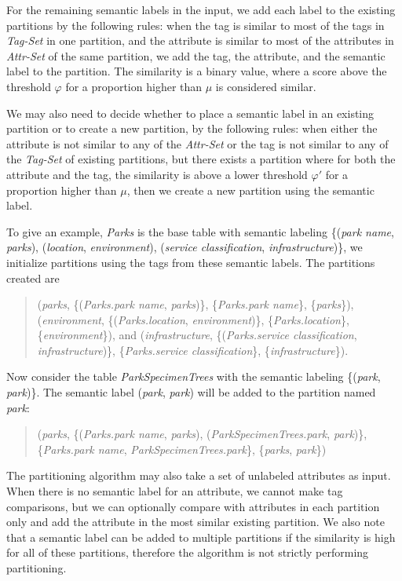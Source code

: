 For the remaining semantic labels in the input, we add each label to the existing partitions by the following rules: when the tag is similar to most of the tags in \textit{Tag-Set} in one partition, and the attribute is similar to most of the attributes in \textit{Attr-Set} of the same partition, we add the tag, the attribute, and the semantic label to the partition. The similarity is a binary value, where a score above the threshold $\varphi$ for a proportion higher than $\mu$ is considered similar. 

We may also need to decide whether to place a semantic label in an existing partition or to create a new partition, by the following rules: when either the attribute is not similar to any of the \textit{Attr-Set} or the tag is not similar to any of the \textit{Tag-Set} of existing partitions, but there exists a partition where for both the attribute and the tag, the similarity is above a lower threshold $\varphi '$ for a proportion higher than $\mu$, then we create a new partition using the semantic label.

To give an example, \textit{Parks} is the base table with semantic labeling \{(\textit{park name}, \textit{parks}), (\textit{location}, \textit{environment}), (\textit{service classification}, \textit{infrastructure})\}, we initialize partitions using the tags from these semantic labels. The partitions created are
\begin{quote}
(\textit{parks}, \{(\textit{Parks.park name}, \textit{parks})\}, \{\textit{Parks.park name}\}, \{\textit{parks}\}),
(\textit{environment}, \{(\textit{Parks.location}, \textit{environment})\}, \{\textit{Parks.location}\}, \{\textit{environment}\}), and
(\textit{infrastructure}, \{(\textit{Parks.service classification}, \textit{infrastructure})\}, \{\textit{Parks.service classification}\}, \{\textit{infrastructure}\}).
\end{quote}

Now consider the table \textit{ParkSpecimenTrees} with the semantic labeling \{(\textit{park}, \textit{park})\}. The semantic label (\textit{park}, \textit{park}) will be added to the partition named \textit{park}:
\begin{quote}
(\textit{parks}, \{(\textit{Parks.park name}, \textit{parks}), (\textit{ParkSpecimenTrees.park}, \textit{park})\}, \{\textit{Parks.park name}, \textit{ParkSpecimenTrees.park}\}, \{\textit{parks}, \textit{park}\})
\end{quote}

The partitioning algorithm may also take a set of unlabeled attributes as input. When there is no semantic label for an attribute, we cannot make tag comparisons, but we can optionally compare with attributes in each partition only and add the attribute in the most similar existing partition. We also note that a semantic label can be added to multiple partitions if the similarity is high for all of these partitions, therefore the algorithm is not strictly performing partitioning.
\endinput